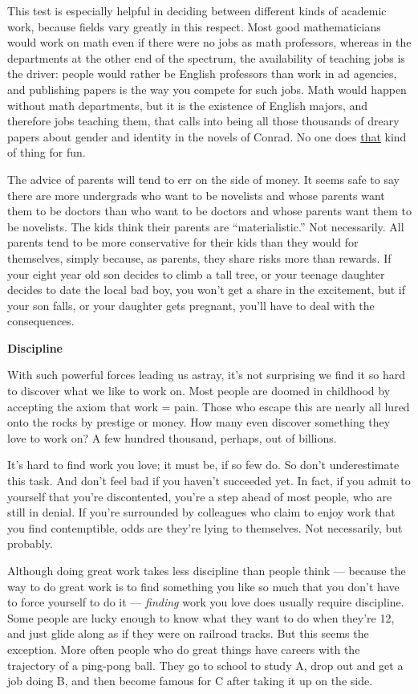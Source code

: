 This test is especially helpful in deciding between different kinds of
academic work, because fields vary greatly in this respect. Most good
mathematicians would work on math even if there were no jobs as math
professors, whereas in the departments at the other end of the spectrum,
the availability of teaching jobs is the driver: people would rather be
English professors than work in ad agencies, and publishing papers is
the way you compete for such jobs. Math would happen without math
departments, but it is the existence of English majors, and therefore
jobs teaching them, that calls into being all those thousands of dreary
papers about gender and identity in the novels of Conrad. No one does
\href{http://www.google.com/scholar?q=gender+identity+narrative+discourse+transcend}{that}
kind of thing for fun.

The advice of parents will tend to err on the side of money. It seems
safe to say there are more undergrads who want to be novelists and whose
parents want them to be doctors than who want to be doctors and whose
parents want them to be novelists. The kids think their parents are
``materialistic.'' Not necessarily. All parents tend to be more
conservative for their kids than they would for themselves, simply
because, as parents, they share risks more than rewards. If your eight
year old son decides to climb a tall tree, or your teenage daughter
decides to date the local bad boy, you won't get a share in the
excitement, but if your son falls, or your daughter gets pregnant,
you'll have to deal with the consequences.

\textbf{Discipline}

With such powerful forces leading us astray, it's not surprising we find
it so hard to discover what we like to work on. Most people are doomed
in childhood by accepting the axiom that work = pain. Those who escape
this are nearly all lured onto the rocks by prestige or money. How many
even discover something they love to work on? A few hundred thousand,
perhaps, out of billions.

It's hard to find work you love; it must be, if so few do. So don't
underestimate this task. And don't feel bad if you haven't succeeded
yet. In fact, if you admit to yourself that you're discontented, you're
a step ahead of most people, who are still in denial. If you're
surrounded by colleagues who claim to enjoy work that you find
contemptible, odds are they're lying to themselves. Not necessarily, but
probably.

Although doing great work takes less discipline than people think ---
because the way to do great work is to find something you like so much
that you don't have to force yourself to do it --- \emph{finding} work
you love does usually require discipline. Some people are lucky enough
to know what they want to do when they're 12, and just glide along as if
they were on railroad tracks. But this seems the exception. More often
people who do great things have careers with the trajectory of a
ping-pong ball. They go to school to study A, drop out and get a job
doing B, and then become famous for C after taking it up on the side.

